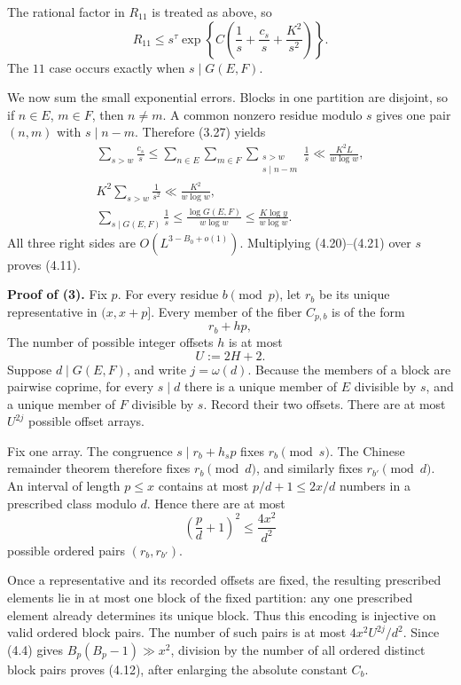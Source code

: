 \documentclass[10pt,letterpaper]{article}
\begin{document}
The rational factor in $R_{11}$ is treated as above, so
\begin{equation}
R_{11}\le s^\tau\exp\left\{C\left(\frac1s+\frac{c_s}{s}+\frac{K^2}{s^2}\right)\right\}.
\tag{4.21}
\end{equation}
The $11$ case occurs exactly when $s\mid G(E,F)$.

We now sum the small exponential errors. Blocks in one partition are disjoint, so if $n\in E$, $m\in F$, then
$n\ne m$. A common nonzero residue modulo $s$ gives one pair $(n,m)$ with $s\mid n-m$. Therefore (3.27) yields
\begin{equation}
\begin{gathered}
\sum_{s>w}\frac{c_s}{s}\le\sum_{n\in E}\sum_{m\in F}\sum_{\substack{s>w\\s\mid n-m}}\frac1s
\ll\frac{K^2L}{w\log w},\\
K^2\sum_{s>w}\frac1{s^2}\ll\frac{K^2}{w\log w},\\
\sum_{s\mid G(E,F)}\frac1s\le\frac{\log G(E,F)}{w\log w}\le\frac{K\log y}{w\log w}.
\end{gathered}
\tag{4.22}
\end{equation}
All three right sides are $O(L^{3-B_0+o(1)})$. Multiplying (4.20)--(4.21) over $s$ proves (4.11).

\textbf{Proof of (3).} Fix $p$. For every residue $b\pmod p$, let $r_b$ be its unique representative in $(x,x+p]$. Every
member of the fiber $C_{p,b}$ is of the form
\[
r_b+hp,
\]
The number of possible integer offsets $h$ is at most
\begin{equation}
U:=2H+2.
\tag{4.23}
\end{equation}
Suppose $d\mid G(E,F)$, and write $j=\omega(d)$. Because the members of a block are pairwise coprime, for every
$s\mid d$ there is a unique member of $E$ divisible by $s$, and a unique member of $F$ divisible by $s$. Record their two
offsets. There are at most $U^{2j}$ possible offset arrays.

Fix one array. The congruence $s\mid r_b+h_sp$ fixes $r_b\pmod s$. The Chinese remainder theorem therefore
fixes $r_b\pmod d$, and similarly fixes $r_{b'}\pmod d$. An interval of length $p\le x$ contains at most $p/d+1\le2x/d$
numbers in a prescribed class modulo $d$. Hence there are at most
\[
\left(\frac pd+1\right)^2\le\frac{4x^2}{d^2}
\]
possible ordered pairs $(r_b,r_{b'})$.

Once a representative and its recorded offsets are fixed, the resulting prescribed elements lie in at most one
block of the fixed partition: any one prescribed element already determines its unique block. Thus this encoding
is injective on valid ordered block pairs. The number of such pairs is at most $4x^2U^{2j}/d^2$. Since (4.4) gives
$B_p(B_p-1)\gg x^2$, division by the number of all ordered distinct block pairs proves (4.12), after enlarging the
absolute constant $C_b$.
\end{document}
